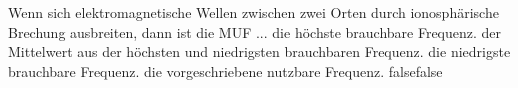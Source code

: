     {Wenn sich elektromagnetische Wellen zwischen zwei Orten durch ionosphärische Brechung ausbreiten, dann ist die MUF ...}
    {die höchste brauchbare Frequenz.}
    {der Mittelwert aus der höchsten und niedrigsten brauchbaren Frequenz.}
    {die niedrigste brauchbare Frequenz.}
    {die vorgeschriebene nutzbare Frequenz.}
    {false}{false}